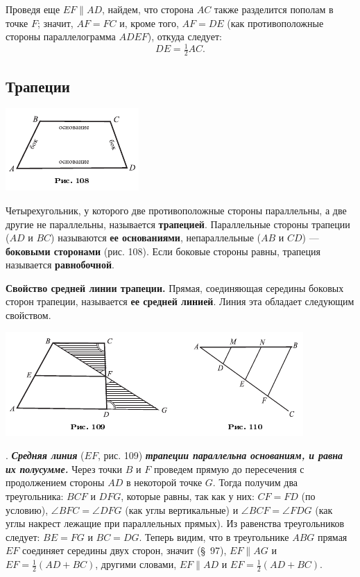 \documentclass[oneside]{book}
\begin{document}
Проведя еще $EF \parallel AD$, найдем, что сторона $AC$ также разделится пополам в точке $F$;
значит, $AF=FC$ и, кроме того, $AF=DE$
(как противоположные стороны параллелограмма $ADEF$), откуда следует:
\[DE=\tfrac12AC.\]

\subsection*{Трапеции}

\includegraphics{pics/ris-108}

Четырехугольник, у которого две противоположные стороны параллельны, а две другие не параллельны, называется \textbf{трапецией}.
Параллельные стороны трапеции ($AD$ и $BC$) называются \textbf{ее основаниями}, непараллельные ($AB$ и $CD$) — \textbf{боковыми сторонами} (рис. 108).
Если боковые стороны равны, трапеция называется \textbf{равнобочной}.

\textbf{Свойство средней линии трапеции.}
Прямая, соединяющая середины боковых сторон трапеции, называется \textbf{ее средней линией}.
Линия эта обладает следующим свойством.

\includegraphics{pics/ris-109-110}

.
\textbf{\emph{Средняя линия}} ($EF$, рис. 109) \textbf{\emph{трапеции параллельна основаниям, и равна их полусумме.}}
Через точки $B$ и $F$ проведем прямую до пересечения с продолжением стороны $AD$ в некоторой точке $G$.
Тогда получим два треугольника:
$BCF$ и $DFG$, которые равны, так как у них:
$CF=FD$ (по условию), $\angle BFC=\angle DFG$ (как углы вертикальные) и $\angle BCF = \angle FDG$ (как углы накрест лежащие при параллельных прямых).
Из равенства треугольников следует:
$BE=FG$ и $BC=DG$.
Теперь видим, что в треугольнике $ABG$ прямая $EF$ соединяет середины двух сторон, значит (§~97), $EF \parallel AG$ и $EF = \tfrac12(AD+BC)$, другими словами, $EF\parallel AD$ и $EF = \tfrac12(AD + BC)$.
\end{document}
